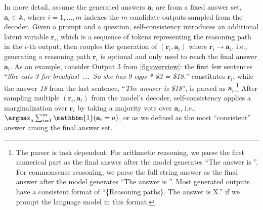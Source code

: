 \documentclass{article} %
\begin{document}
In more detail, assume the generated answers $\mathbf{a}_i$ are from a fixed answer set, $\mathbf{a}_i\in \mathbb{A}$, where $i=1, \ldots, m$ indexes the $m$ candidate outputs sampled from the decoder. 
Given a prompt and a question, self-consistency introduces an additional latent variable $\mathbf{r}_i$, which is a sequence of tokens representing the reasoning path in the $i$-th output, then couples the generation of $(\mathbf{r}_i, \mathbf{a}_i)$ where $\mathbf{r}_i\rightarrow \mathbf{a}_i$, i.e., generating a reasoning path $\mathbf{r}_i$ is optional and only used to reach the final answer $\mathbf{a}_i$.
As an example, consider Output 3 from \cref{fig:overview}: 
the first few sentences ``\textit{She eats 3 for breakfast\ ...\ So she has 9 eggs * \$2 = \$18.}'' constitutes $\mathbf{r}_i$, while the answer \textit{18} from the last sentence, ``\textit{The answer is \$18}'', is parsed as $\mathbf{a}_i$.\footnote{The parser is task dependent. For arithmetic reasoning, we parse the first numerical part as the final answer after the model generates ``The answer is ''. For commonsense reasoning, we parse the full string answer as the final answer after the model generates ``The answer is ''. Most generated outputs have a consistent format of ``\{Reasoning paths\}. The answer is X.'' if we prompt the language model in this format.}
After sampling multiple $(\mathbf{r}_i, \mathbf{a}_i)$ from the model's decoder, self-consistency applies a marginalization over $\mathbf{r}_i$ by taking a majority vote over $\mathbf{a}_i$, i.e., $\argmax_a\sum\nolimits_{i=1}^m \mathbbm{1} (\mathbf{a}_i = a)$, or as we defined as the most ``consistent'' answer among the final answer set.


\end{document}

